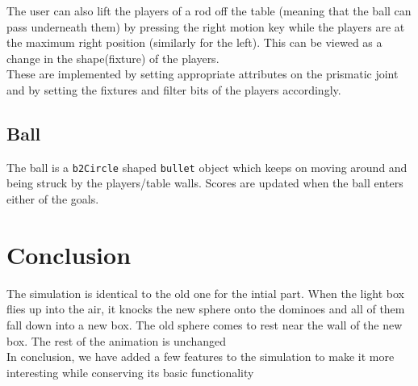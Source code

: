 \documentclass{article}
\begin{document}
The user can also lift the players of a rod off the table (meaning that the ball can pass underneath them) by pressing the right motion key while the players are at the maximum right position (similarly for the left). This can be viewed as a change in the shape(fixture) of the players.\\

These are implemented by setting appropriate attributes on the prismatic joint and by setting the fixtures and filter bits of the players accordingly.\\
\subsection{Ball}
The ball is a \texttt{b2Circle} shaped \texttt{bullet} object which keeps on moving around and being struck by the players/table walls. Scores are updated when the ball enters either of the goals.\\

\section{Conclusion}
The simulation is identical to the old one for the intial part. When the light box flies up into the air, it knocks the new sphere onto the dominoes and all of them fall down into a new box. The old sphere comes to rest near the wall of the new box. The rest of the animation is unchanged\\
In conclusion, we have added a few features to the simulation to make it more interesting while conserving its basic functionality \\


\end{document}
